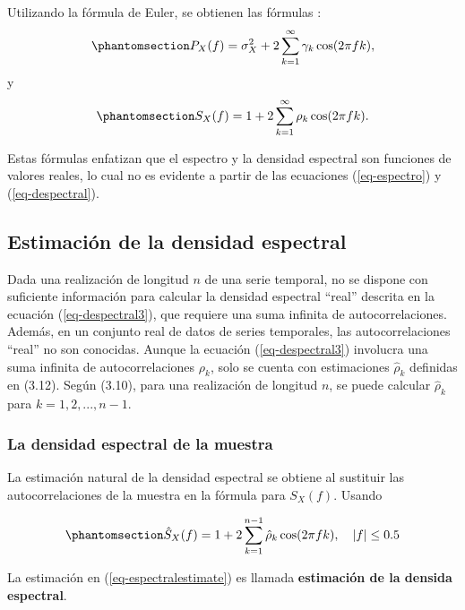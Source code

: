 \documentclass[
  us-letterpaper,
]{scrreprt}
\theoremstyle{plain}
\theoremstyle{definition}
\theoremstyle{definition}
\theoremstyle{remark}
\begin{document}
Utilizando la fórmula de Euler, se obtienen las fórmulas :
\begin{equation}\phantomsection\label{eq-espectro2}{
P_X(f) = \sigma_X^2 + 2 \sum_{k=1}^{\infty} \gamma_k \cos(2\pi fk),
}\end{equation} y \begin{equation}\phantomsection\label{eq-despectral3}{
S_X(f) = 1 + 2 \sum_{k=1}^{\infty} \rho_k \cos(2\pi fk).
}\end{equation}

Estas fórmulas enfatizan que el espectro y la densidad espectral son
funciones de valores reales, lo cual no es evidente a partir de las
ecuaciones (\ref{eq-espectro}) y (\ref{eq-despectral}).

\subsection{Estimación de la densidad
espectral}\label{estimaciuxf3n-de-la-densidad-espectral}

Dada una realización de longitud \(n\) de una serie temporal, no se
dispone con suficiente información para calcular la densidad espectral
``real'' descrita en la ecuación (\ref{eq-despectral3}), que requiere
una suma infinita de autocorrelaciones. Además, en un conjunto real de
datos de series temporales, las autocorrelaciones ``real'' no son
conocidas. Aunque la ecuación (\ref{eq-despectral3}) involucra una suma
infinita de autocorrelaciones \(\rho_k\), solo se cuenta con
estimaciones \(\hat{\rho}_k\) definidas en (3.12). Según (3.10), para
una realización de longitud \(n\), se puede calcular \(\hat{\rho}_k\)
para \(k = 1, 2, ..., n-1\).

\subsubsection{La densidad espectral de la muestra}\label{sec-ESDM}

La estimación natural de la densidad espectral se obtiene al sustituir
las autocorrelaciones de la muestra en la fórmula para \(S_X(f)\).
Usando

\begin{equation}\phantomsection\label{eq-espectralestimate}{
\hat{S}_X(f) = 1 + 2 \sum_{k=1}^{n-1} \hat{\rho}_k \cos(2\pi f k), \quad |f| \leq 0.5
}\end{equation}

La estimación en (\ref{eq-espectralestimate}) es llamada
\textbf{estimación de la densida espectral}.
\end{document}
